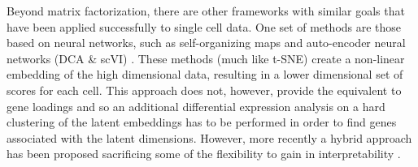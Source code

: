 Beyond matrix factorization, there are other frameworks with similar goals that have been applied successfully to single cell data. One set of methods are those based on neural networks, such as self-organizing maps \parencite{Loffler-Wirth2015oposSOM, Kim2015SingleCell} and auto-encoder neural networks (DCA \& scVI) \parencite{Eraslan2019Singlecell, Lopez2018Deep}. These methods (much like t-SNE) create a non-linear embedding of the high dimensional data, resulting in a lower dimensional set of scores for each cell. This approach does not, however, provide the equivalent to gene loadings and so an additional differential expression analysis on a hard clustering of the latent embeddings has to be performed in order to find genes associated with the latent dimensions. However, more recently a hybrid approach has been proposed sacrificing some of the flexibility to gain in interpretability \parencite{Svensson2019Interpretable}.


